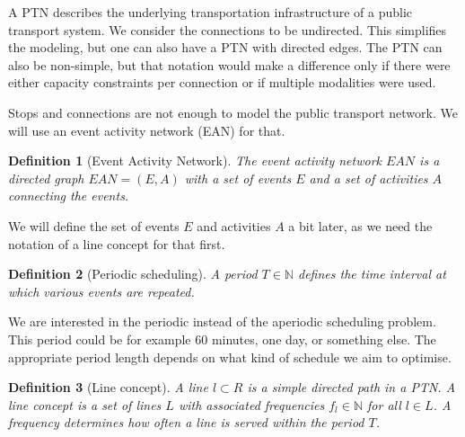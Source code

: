 \documentclass[english, 12pt, a4paper, sci, utf8, a-2b, online]{aaltothesis}
\newtheorem{definition}{Definition}
\newcommand{\N}{\mathbb{N}}
\newcommand{\period}{T}
\begin{document}
A PTN describes the underlying transportation infrastructure of a public transport system. We consider the connections to be undirected. This simplifies the modeling, but one can also have a PTN with directed edges. The PTN can also be non-simple, but that notation would make a difference only if there were either capacity constraints per connection or if multiple modalities were used.

Stops and connections are not enough to model the public transport network. We will use an event activity network (EAN) for that.
\begin{definition}[Event Activity Network]\label{def:ean}
    The event activity network $EAN$ is a directed graph $\textit{EAN} = (E, A)$ with a set of events $E$ and a set of activities $A$ connecting the events.
\end{definition}
We will define the set of events $E$ and activities $A$ a bit later, as we need the notation of a line concept for that first.

\begin{definition}[Periodic scheduling] 
    A period $\period \in \N$ defines the time interval at which various events are repeated.
\end{definition}

We are interested in the periodic instead of the aperiodic scheduling problem. This period could be for example 60 minutes, one day, or something else. The appropriate period length depends on what kind of schedule we aim to optimise. %

\begin{definition}[Line concept]
    A \textit{line} $l \subset R$ is a simple directed path in a PTN. A \textit{line concept} is a set of lines $L$ with associated frequencies $f_l \in \N$ for all $l \in L$. A frequency determines how often a line is served within the period $T$.
\end{definition}

\end{document}
